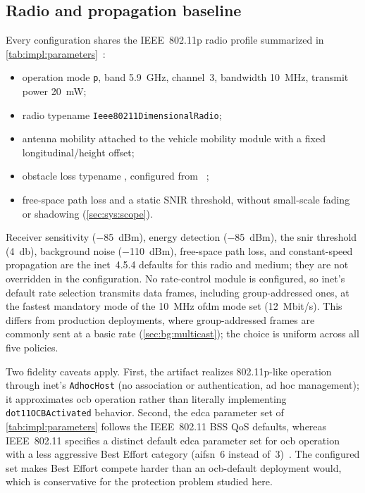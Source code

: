 \subsection{Radio and propagation baseline}
\label{sec:impl:radio}

Every configuration shares the IEEE~802.11p radio profile summarized in \autoref{tab:impl:parameters}~\cite{IEEE80211,inet_framework}:

\begin{itemize}
  \item operation mode \texttt{p}, band 5.9~GHz, channel~3, bandwidth 10~MHz, transmit power 20~mW;
  \item radio typename \texttt{Ieee80211DimensionalRadio};
  \item antenna mobility attached to the vehicle mobility module with a fixed longitudinal/height offset;
  \item obstacle loss typename ,\newline
        configured from ~\cite{inet_ideal_obstacle_loss};
  \item free-space path loss and a static SNIR threshold, without small-scale fading or shadowing (\autoref{sec:sys:scope}).
\end{itemize}

Receiver sensitivity ($-$85~dBm), energy detection ($-$85~dBm), the \gls{snir} threshold (\SI{4}{\decibel}), background noise ($-$110~dBm), free-space path loss, and constant-speed propagation are the \gls{inet}~4.5.4 defaults for this radio and medium; they are not overridden in the configuration.
No rate-control module is configured, so \gls{inet}'s default rate selection transmits data frames, including group-addressed ones, at the fastest mandatory mode of the \SI{10}{\mega\hertz} \gls{ofdm} mode set (12~Mbit/s).
This differs from production deployments, where group-addressed frames are commonly sent at a basic rate (\autoref{sec:bg:multicast}); the choice is uniform across all five policies.

Two fidelity caveats apply.
First, the artifact realizes 802.11p-like operation through \gls{inet}'s \texttt{AdhocHost} (no association or authentication, ad hoc management); it approximates \gls{ocb} operation rather than literally implementing \texttt{dot11OCBActivated} behavior.
Second, the \gls{edca} parameter set of \autoref{tab:impl:parameters} follows the IEEE~802.11 BSS QoS defaults, whereas IEEE~802.11 specifies a distinct default \gls{edca} parameter set for \gls{ocb} operation with a less aggressive Best Effort category (\gls{aifsn}~6 instead of~3)~\cite{IEEE80211,etsi_en_302663}.
The configured set makes Best Effort compete harder than an \gls{ocb}-default deployment would, which is conservative for the protection problem studied here.

